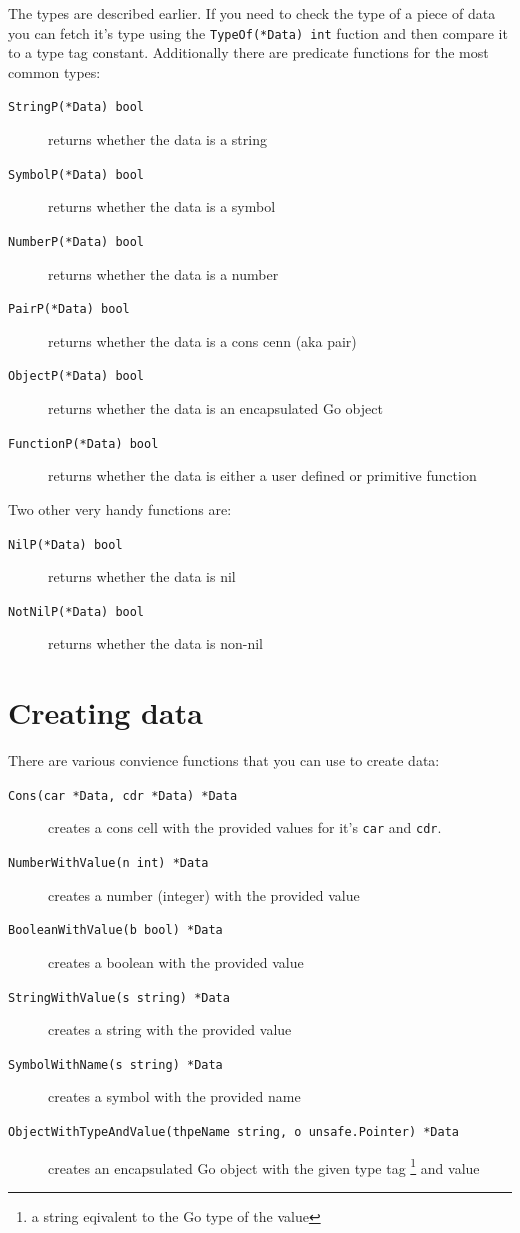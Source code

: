 \documentclass[12pt]{article}
\begin{document}
\noindent The types are described earlier. If you need to check the type of a piece of data you can fetch it's type using the \verb|TypeOf(*Data) int| fuction and then compare it to a type tag constant. Additionally there are predicate functions for the most common types:

\begin{description}
\item [{\tt StringP(*Data) bool}] returns whether the data is a string
\item [{\tt SymbolP(*Data) bool}] returns whether the data is a symbol
\item [{\tt NumberP(*Data) bool}] returns whether the data is a number
\item [{\tt PairP(*Data) bool}] returns whether the data is a cons cenn
  (aka pair)
\item [{\tt ObjectP(*Data) bool}] returns whether the data is an encapsulated Go object
\item [{\tt FunctionP(*Data) bool}] returns whether the data is either
  a user defined or primitive function
\end{description}

\noindent Two other very handy functions are:

\begin{description}
\item [{\tt NilP(*Data) bool}] returns whether the data is nil
\item [{\tt NotNilP(*Data) bool}] returns whether the data is non-nil
\end{description}

\section{Creating data}

There are various convience functions that you can use to create data:

\begin{description}
\item [{\tt Cons(car *Data, cdr *Data) *Data}] creates a cons cell
  with the provided values for it's \verb|car| and \verb|cdr|.
\item [{\tt NumberWithValue(n int) *Data}] creates a number (integer)
  with the provided value
\item [{\tt BooleanWithValue(b bool) *Data}] creates a boolean with
  the provided value
\item [{\tt StringWithValue(s string) *Data}] creates a string with
  the provided value
\item [{\tt SymbolWithName(s string) *Data}] creates a symbol with the
  provided name
\item [{\tt ObjectWithTypeAndValue(thpeName string, o unsafe.Pointer)
    *Data}] creates an encapsulated Go object with the given type tag
  \footnote{a string eqivalent to the Go type of the value}
  and value
\end{description}
\end{document}
